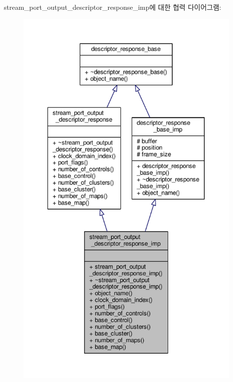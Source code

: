 stream\+\_\+port\+\_\+output\+\_\+descriptor\+\_\+response\+\_\+imp에 대한 협력 다이어그램\+:
\nopagebreak
\begin{figure}[H]
\begin{center}
\leavevmode
\includegraphics[height=550pt]{classavdecc__lib_1_1stream__port__output__descriptor__response__imp__coll__graph}
\end{center}
\end{figure}
